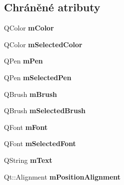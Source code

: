 \subsection*{Chráněné atributy}
\begin{DoxyCompactItemize}
\item 
\hypertarget{classQCPItemText_a8407f284ad867f627878cc26ef433d08}{}Q\+Color {\bfseries m\+Color}\label{classQCPItemText_a8407f284ad867f627878cc26ef433d08}

\item 
\hypertarget{classQCPItemText_a7eb64e42f5f7998a97d8907ad25933c1}{}Q\+Color {\bfseries m\+Selected\+Color}\label{classQCPItemText_a7eb64e42f5f7998a97d8907ad25933c1}

\item 
\hypertarget{classQCPItemText_aa02388705dbbff1bf7b8aa872b5f579c}{}Q\+Pen {\bfseries m\+Pen}\label{classQCPItemText_aa02388705dbbff1bf7b8aa872b5f579c}

\item 
\hypertarget{classQCPItemText_a8eaec649606d6ead2d8d4dcb5691777c}{}Q\+Pen {\bfseries m\+Selected\+Pen}\label{classQCPItemText_a8eaec649606d6ead2d8d4dcb5691777c}

\item 
\hypertarget{classQCPItemText_a2535911875faa459b8337f2efccb5cb8}{}Q\+Brush {\bfseries m\+Brush}\label{classQCPItemText_a2535911875faa459b8337f2efccb5cb8}

\item 
\hypertarget{classQCPItemText_a28ccd097b42a216d81db9c6869f54a59}{}Q\+Brush {\bfseries m\+Selected\+Brush}\label{classQCPItemText_a28ccd097b42a216d81db9c6869f54a59}

\item 
\hypertarget{classQCPItemText_a1dc87fe2a824820d549ffd7e644eef8d}{}Q\+Font {\bfseries m\+Font}\label{classQCPItemText_a1dc87fe2a824820d549ffd7e644eef8d}

\item 
\hypertarget{classQCPItemText_a6702f141fae590b2f4f1ec02fe9f8bd5}{}Q\+Font {\bfseries m\+Selected\+Font}\label{classQCPItemText_a6702f141fae590b2f4f1ec02fe9f8bd5}

\item 
\hypertarget{classQCPItemText_a2dec3e08c11f51639629374ecec3bd62}{}Q\+String {\bfseries m\+Text}\label{classQCPItemText_a2dec3e08c11f51639629374ecec3bd62}

\item 
\hypertarget{classQCPItemText_a6c27f7dc1a962a04b32430cf99f04654}{}Qt\+::\+Alignment {\bfseries m\+Position\+Alignment}\label{classQCPItemText_a6c27f7dc1a962a04b32430cf99f04654}


\end{DoxyCompactItemize}
